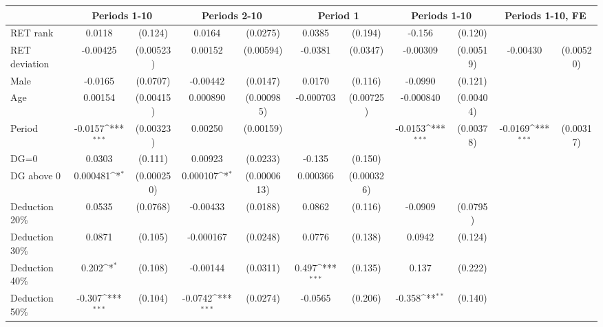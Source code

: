 {
\def\sym#1{\ifmmode^{#1}\else\(^{#1}\)\fi}
\begin{tabular}{l*{5}{cc}}
\hline\hline
                &\multicolumn{2}{c}{Periods 1-10}&\multicolumn{2}{c}{Periods 2-10}&\multicolumn{2}{c}{Period 1}&\multicolumn{2}{c}{Periods 1-10}&\multicolumn{2}{c}{Periods 1-10, FE}\\
\hline
RET rank        &   0.0118         &  (0.124)&   0.0164         & (0.0275)&   0.0385         &  (0.194)&   -0.156         &  (0.120)&                  &         \\
RET deviation   & -0.00425         &(0.00523)&  0.00152         &(0.00594)&  -0.0381         & (0.0347)& -0.00309         &(0.00519)& -0.00430         &(0.00520)\\
Male            &  -0.0165         & (0.0707)& -0.00442         & (0.0147)&   0.0170         &  (0.116)&  -0.0990         &  (0.121)&                  &         \\
Age             &  0.00154         &(0.00415)& 0.000890         &(0.000985)&-0.000703         &(0.00725)&-0.000840         &(0.00404)&                  &         \\
Period          &  -0.0157\sym{***}&(0.00323)&  0.00250         &(0.00159)&                  &         &  -0.0153\sym{***}&(0.00378)&  -0.0169\sym{***}&(0.00317)\\
DG=0            &   0.0303         &  (0.111)&  0.00923         & (0.0233)&   -0.135         &  (0.150)&                  &         &                  &         \\
DG above 0      & 0.000481\sym{*}  &(0.000250)& 0.000107\sym{*}  &(0.0000613)& 0.000366         &(0.000326)&                  &         &                  &         \\
Deduction 20\%  &   0.0535         & (0.0768)& -0.00433         & (0.0188)&   0.0862         &  (0.116)&  -0.0909         & (0.0795)&                  &         \\
Deduction 30\%  &   0.0871         &  (0.105)&-0.000167         & (0.0248)&   0.0776         &  (0.138)&   0.0942         &  (0.124)&                  &         \\
Deduction 40\%  &    0.202\sym{*}  &  (0.108)& -0.00144         & (0.0311)&    0.497\sym{***}&  (0.135)&    0.137         &  (0.222)&                  &         \\
Deduction 50\%  &   -0.307\sym{***}&  (0.104)&  -0.0742\sym{***}& (0.0274)&  -0.0565         &  (0.206)&   -0.358\sym{**} &  (0.140)&                  &         \\

\end{tabular}}
